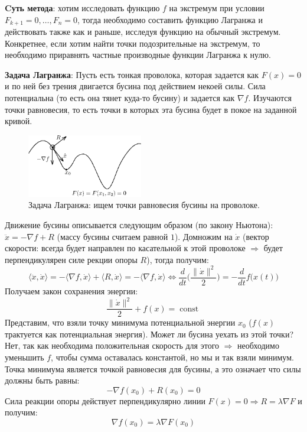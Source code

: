 \documentclass[12pt]{article}
\theoremstyle{definition}
\DeclareMathOperator{\const}{\text{const}}
\begin{document}
\textbf{Cуть метода}: хотим исследовать функцию $f$ на экстремум при условии $F_{k+1} = 0,\dotsc, F_n = 0$, тогда необходимо составить функцию Лагранжа и действовать также как и раньше, исследуя функцию на обычный экстремум. Конкретнее, если хотим найти точки подозрительные на экстремум, то необходимо приравнять частные производные функции Лагранжа к нулю.

\textbf{Задача Лагранжа}: Пусть есть тонкая проволока, которая задается как $F(x) = 0$ и по ней без трения двигается бусина под действием некоей силы. Сила потенциальна (то есть она тянет куда-то бусину) и задается как $\nabla f$. Изучаются точки равновесия, то есть точки в которых эта бусина будет в покое на заданной кривой.
\begin{figure}[H]
	\centering
	\includegraphics[width=0.45\textwidth]{20_7.eps}
	\caption{Задача Лагранжа: ищем точки равновесия бусины на проволоке.}
	\label{20_7}
\end{figure}
Движение бусины описывается следующим образом (по закону Ньютона): $\ddot{x} = - \nabla f + R$ (массу бусины считаем равной $1$). Домножим на $\dot{x}$ (вектор скорости: всегда будет направлен по касательной к этой проволоке $\Rightarrow$ будет перпендикулярен силе рекции опоры $R$), тогда получим:
$$
	\langle \ddot{x}, \dot{x} \rangle = -\langle \nabla f, \dot{x} \rangle + \langle R, \dot{x} \rangle =  -\langle \nabla f, \dot{x} \rangle \Leftrightarrow \dfrac{d}{dt}\bigg(\dfrac{\|\dot{x}\|^2}{2}\bigg) = -\dfrac{d}{dt}f \big(x(t)\big)
$$
Получаем закон сохранения энергии:
$$
	\dfrac{\|\dot{x}\|^2}{2} + f(x) = \const 
$$
Представим, что взяли точку минимума потенциальной энергии $x_0$ ($f(x)$ трактуется как потенциальная энергия). Может ли бусина уехать из этой точки? Нет, так как необходима положительная скорость для этого $\Rightarrow$ необходимо уменьшить $f$, чтобы сумма оставалась константой, но мы и так взяли минимум. Точка минимума является точкой равновесия для бусины, а это означает что силы должны быть равны:
$$
	-\nabla f(x_0) + R(x_0) = 0
$$
Сила реакции опоры действует перпендикулярно линии $F(x) = 0 \Rightarrow R = \lambda \nabla F$ и получим:
$$
	\nabla f(x_0) = \lambda \nabla F(x_0)
$$
\end{document}
